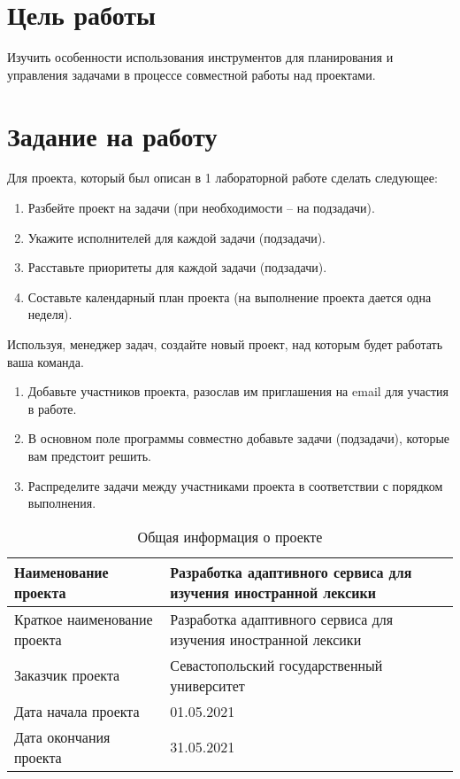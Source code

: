 \documentclass[a4paper,14pt]{extarticle}
\begin{document}


\section{Цель работы}
Изучить особенности использования инструментов для планирования и\\управления
задачами в процессе совместной работы над проектами.

\section{Задание на работу}
Для проекта, который был описан в 1 лабораторной работе сделать следующее:
\begin{enumerate}
    \item Разбейте проект на задачи (при необходимости – на подзадачи).
    \item Укажите исполнителей для каждой задачи (подзадачи).
    \item Расставьте приоритеты для каждой задачи (подзадачи).
    \item Составьте календарный план проекта (на выполнение проекта дается одна неделя).
\end{enumerate}

Используя, менеджер задач, создайте новый проект, над которым будет работать
ваша команда.
\begin{enumerate}
    \item Добавьте участников проекта, разослав им приглашения на email для
          участия в работе.
    \item В основном поле программы совместно добавьте задачи (подзадачи), которые вам предстоит решить.
    \item Распределите задачи между участниками проекта в соответствии с порядком выполнения.
\end{enumerate}

\begin{table}[H]
    \caption{Общая информация о проекте}
    \begin{tabular}{ | p{5.5cm} | p{11cm} | }
        \hline
        Наименование проекта & Разработка адаптивного сервиса для изучения иностранной лексики \\ \hline
        Краткое наименование проекта & Разработка адаптивного сервиса для изучения иностранной лексики \\ \hline
        Заказчик проекта & Севастопольский государственный университет \\ \hline
        Дата начала проекта & 01.05.2021 \\ \hline
        Дата окончания проекта & 31.05.2021 \\ \hline
    \end{tabular}
\end{table}
\end{document}
